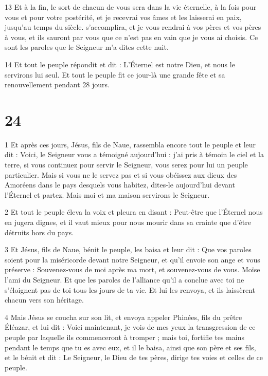 \par 13 Et à la fin, le sort de chacun de vous sera dans la vie éternelle, à la fois pour vous et pour votre postérité, et je recevrai vos âmes et les laisserai en paix, jusqu'au temps du siècle. s'accomplira, et je vous rendrai à vos pères et vos pères à vous, et ils sauront par vous que ce n'est pas en vain que je vous ai choisis. Ce sont les paroles que le Seigneur m’a dites cette nuit.

\par 14 Et tout le peuple répondit et dit : L'Éternel est notre Dieu, et nous le servirons lui seul. Et tout le peuple fit ce jour-là une grande fête et sa renouvellement pendant 28 jours.

\chapter{24}

\par 1 Et après ces jours, Jésus, fils de Naue, rassembla encore tout le peuple et leur dit : Voici, le Seigneur vous a témoigné aujourd'hui : j'ai pris à témoin le ciel et la terre, si vous continuez pour servir le Seigneur, vous serez pour lui un peuple particulier. Mais si vous ne le servez pas et si vous obéissez aux dieux des Amoréens dans le pays desquels vous habitez, dites-le aujourd'hui devant l'Éternel et partez. Mais moi et ma maison servirons le Seigneur.

\par 2 Et tout le peuple éleva la voix et pleura en disant : Peut-être que l'Éternel nous en jugera dignes, et il vaut mieux pour nous mourir dans sa crainte que d'être détruits hors du pays.

\par 3 Et Jésus, fils de Naue, bénit le peuple, les baisa et leur dit : Que vos paroles soient pour la miséricorde devant notre Seigneur, et qu'il envoie son ange et vous préserve : Souvenez-vous de moi après ma mort, et souvenez-vous de vous. Moïse l'ami du Seigneur. Et que les paroles de l'alliance qu'il a conclue avec toi ne s'éloignent pas de toi tous les jours de ta vie. Et lui les renvoya, et ils laissèrent chacun vers son héritage.

\par 4 Mais Jésus se coucha sur son lit, et envoya appeler Phinées, fils du prêtre Éléazar, et lui dit : Voici maintenant, je vois de mes yeux la transgression de ce peuple par laquelle ils commenceront à tromper ; mais toi, fortifie tes mains pendant le temps que tu es avec eux, et il le baisa, ainsi que son père et ses fils, et le bénit et dit : Le Seigneur, le Dieu de tes pères, dirige tes voies et celles de ce peuple.

